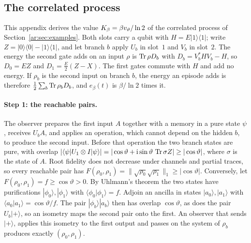 \subsection{The correlated process}\label{ar:app:hidden}

This appendix derives the value $K_\beta=\beta v_\vartheta/\ln2$ of the correlated process of Section~\ref{ar:sec:examples}. Both slots carry a qubit with $H=E|1\rangle\langle1|$; write $Z=|0\rangle\langle0|-|1\rangle\langle1|$, and let branch $b$ apply $U_b$ in slot~$1$ and $V_b$ in slot~$2$. The energy the second gate adds on an input $\rho$ is $\operatorname{Tr}\rho D_b$ with $D_b=V_b^*HV_b-H$, so $D_0=EZ$ and $D_1=\tfrac E2(Z-X)$. The first gates commute with $H$ and add no energy. If $\rho_b$ is the second input on branch $b$, the energy an episode adds is therefore $\tfrac12\sum_b\operatorname{Tr}\rho_bD_b$, and $e_\beta(t)$ is $\beta/\ln2$ times it.

\paragraph{Step 1: the reachable pairs.} The observer prepares the first input $A$ together with a memory in a pure state $\psi$, receives $U_bA$, and applies an operation, which cannot depend on the hidden $b$, to produce the second input. Before that operation the two branch states are pure, with overlap $|\langle\psi|U_1\otimes I|\psi\rangle|=|\cos\vartheta+\mathrm i\sin\vartheta\,\operatorname{Tr}\sigma Z|\ge|\cos\vartheta|$, where $\sigma$ is the state of $A$. Root fidelity does not decrease under channels and partial traces, so every reachable pair has $F(\rho_0,\rho_1)=\|\sqrt{\rho_0}\sqrt{\rho_1}\|_1\ge|\cos\vartheta|$. Conversely, let $F(\rho_0,\rho_1)=f\ge\cos\vartheta>0$. By Uhlmann's theorem the two states have purifications $|\phi_0\rangle,|\phi_1\rangle$ with $\langle\phi_0|\phi_1\rangle=f$. Adjoin an ancilla in states $|a_0\rangle,|a_1\rangle$ with $\langle a_0|a_1\rangle=\cos\vartheta/f$. The pair $|\phi_b\rangle|a_b\rangle$ then has overlap $\cos\vartheta$, as does the pair $U_b|+\rangle$, so an isometry maps the second pair onto the first. An observer that sends $|+\rangle$, applies this isometry to the first output and passes on the system of $\rho_b$ produces exactly $(\rho_0,\rho_1)$.


